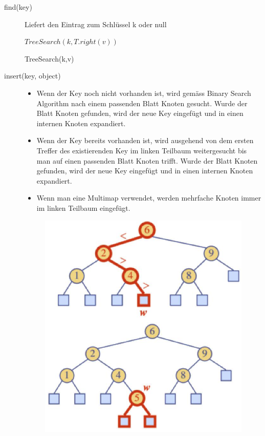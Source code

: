 \begin{description}
	\item[find(key)] \hfill
	Liefert den Eintrag zum Schlüssel k oder null
	\begin{algorithm}
		\begin{algorithmic}[1]
			\ENDIF
			\ELSE
			\RETURN$TreeSearch(k, T.right(v))$
			\ENDIF
		\end{algorithmic}
		\caption{TreeSearch(k,v)}
	\end{algorithm}
	\item[insert(key, object)] \hfill
	\begin{itemize}
		\item Wenn der Key noch nicht vorhanden ist, wird gemäss Binary Search Algorithm nach einem passenden Blatt Knoten gesucht. Wurde der Blatt Knoten gefunden, wird der neue Key eingefügt und in einen internen Knoten expandiert.
		\item Wenn der Key bereits vorhanden ist, wird ausgehend von dem ersten Treffer des existierenden Key im linken Teilbaum weitergesucht bis man auf einen passenden Blatt Knoten trifft. Wurde der Blatt Knoten gefunden, wird der neue Key eingefügt und in einen internen Knoten expandiert.
		\item Wenn man eine Multimap verwendet, werden mehrfache Knoten immer im linken Teilbaum eingefügt.
	\end{itemize}
	\begin{figure}[ht!]
		\centering
		\begin{minipage}[t]{0.4\textwidth}
			\centering
			\includegraphics[width=0.9\linewidth]{images/search_tree_insert_1}

\end{minipage}
\end{figure}
\end{description}

